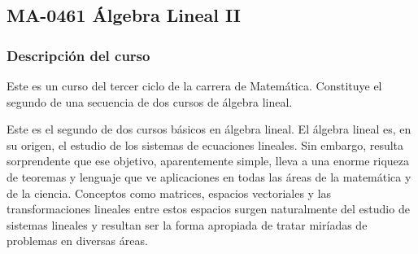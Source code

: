 \newpage
\subsection*{MA-0461 Álgebra Lineal II}

\hypertarget{MA0461}{}
\begin{refsection}
\begin{table}[H]
\end{table}



\subsubsection*{Descripción del curso}

Este es un curso del tercer ciclo de la carrera de Matemática. Constituye el segundo de una secuencia de dos cursos de álgebra lineal. 

Este es el segundo de dos cursos b\'asicos en \'algebra lineal. El \'algebra lineal es,
en su origen, el estudio de los sistemas de ecuaciones lineales. Sin embargo, resulta
sorprendente que ese objetivo, aparentemente simple, lleva a una enorme riqueza de
teoremas y lenguaje que ve aplicaciones en todas las \'areas de la matem\'atica y de la
ciencia. Conceptos como matrices, espacios vectoriales y las transformaciones lineales
entre estos espacios surgen naturalmente del estudio de sistemas lineales y resultan ser
la forma apropiada de tratar mir\'iadas de problemas en diversas \'areas.


\end{refsection}
